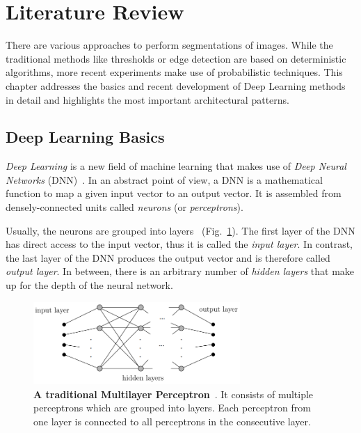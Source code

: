 \section{Literature Review}
There are various approaches to perform segmentations of images. While the traditional methods like thresholds or edge detection are based on deterministic algorithms, more recent experiments make use of probabilistic techniques. This chapter addresses the basics and recent development of Deep Learning methods in detail and highlights the most important architectural patterns.

\subsection{Deep Learning Basics}
\emph{Deep Learning} is a new field of machine learning that makes use of \emph{Deep Neural Networks} (DNN)~\cite[pp.~125f]{nn_intro96}. In an abstract point of view, a DNN is a mathematical function to map a given input vector to an output vector. It is assembled from densely-connected units called \emph{neurons} (or \emph{perceptrons}).

Usually, the neurons are grouped into layers~\cite[p.~125]{nn_intro96} (Fig.~\ref{fig:layered_architecture}). The first layer of the DNN has direct access to the input vector, thus it is called the \emph{input layer}. In contrast, the last layer of the DNN produces the output vector and is therefore called \emph{output layer}. In between, there is an arbitrary number of \emph{hidden layers} that make up for the depth of the neural network.

\begin{figure}[h]
    \centering
    \includegraphics[width=0.7\textwidth]{images/generic_layered_architecture}
    \caption[A traditional Multilayer Perceptron]
    {\textbf{A traditional Multilayer Perceptron}~\cite[p.~126]{nn_intro96}. It consists of multiple perceptrons which are grouped into layers. Each perceptron from one layer is connected to all perceptrons in the consecutive layer.}
    \label{fig:layered_architecture}
\end{figure}

